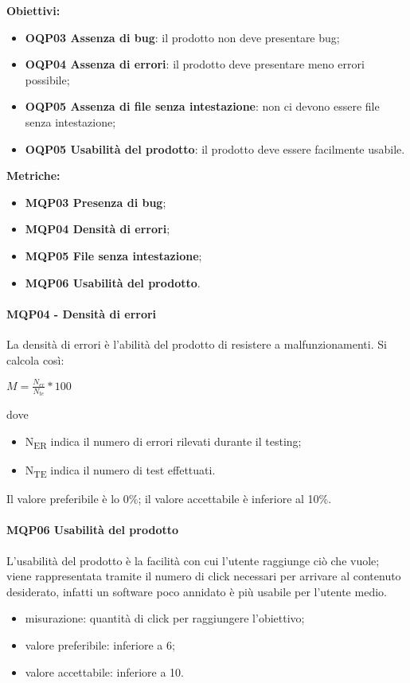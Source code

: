 \documentclass[../piano_di_qualifica.tex]{subfiles}
\begin{document}
\smallbreak
\textbf{Obiettivi:}
\smallbreak
\begin{itemize}
	\item \textbf{OQP03 Assenza di bug}: il prodotto non deve presentare bug;
	\item \textbf{OQP04 Assenza di errori}: il prodotto deve presentare meno errori possibile;
	\item \textbf{OQP05 Assenza di file senza intestazione}: non ci devono essere file senza intestazione;
	\item \textbf{OQP05 Usabilità del prodotto}: il prodotto deve essere facilmente usabile.
\end{itemize}

\textbf{Metriche:}
\smallbreak
\begin{itemize}
	\item \textbf{MQP03 Presenza di bug};
	\item \textbf{MQP04 Densità di errori};
	\item \textbf{MQP05 File senza intestazione};
	\item \textbf{MQP06 Usabilità del prodotto}.
\end{itemize}


\paragraph{MQP04 - Densità di errori}
La densità di errori è l'abilità del prodotto di resistere a malfunzionamenti. Si calcola così:\par

\begin{center}
	$M = \frac{N_{er}}{N_{te}} * 100$
\end{center}

dove
\smallbreak
\begin{itemize}
	\item N\textsubscript{ER} indica il numero di errori rilevati durante il testing;
	\item N\textsubscript{TE} indica il numero di test effettuati.
\end{itemize}

Il valore preferibile è lo 0\%; il valore accettabile è inferiore al 10\%.

\paragraph{MQP06 Usabilità del prodotto}
L'usabilità del prodotto è la facilità con cui l’utente raggiunge ciò che vuole; viene rappresentata tramite il numero di click necessari per arrivare al contenuto desiderato, infatti un software poco annidato è più usabile per l'utente medio.
\smallbreak
\begin{itemize}
	\item misurazione: quantità di click per raggiungere l'obiettivo;
	\item valore preferibile: inferiore a 6;
	\item valore accettabile: inferiore a 10.
\end{itemize}
\end{document}
